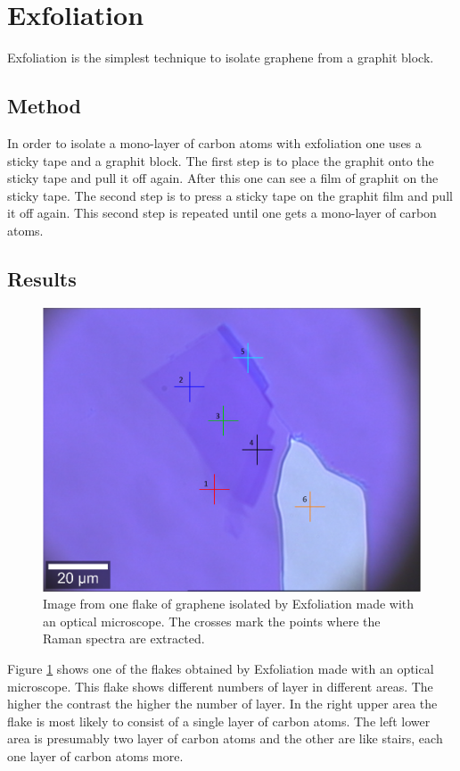 \documentclass[12pt,a4paper]{article}
\begin{document}
\section{Exfoliation}
Exfoliation is the simplest technique to isolate graphene from a graphit block.

\subsection{Method}
In order to isolate a mono-layer of carbon atoms with exfoliation one uses a sticky tape and a graphit block. The first step is to place the graphit onto the sticky tape and pull it off again. After this one can see a film of graphit on the sticky tape. The second step is to press a sticky tape on the graphit film and pull it off again. This second step is repeated until one gets a mono-layer of carbon atoms.

\subsection{Results}

\begin{figure}
\centering
\includegraphics[scale=0.35]{Bilder/Exfoliation/mono_bi_tri_flake.PNG}
\caption{Image from one flake of graphene isolated by Exfoliation made with an optical microscope. The crosses mark the points where the Raman spectra are extracted.}
\label{fig:Exfoliation_Microscope}
\end{figure}

Figure \ref{fig:Exfoliation_Microscope} shows one of the flakes obtained by Exfoliation made with an optical microscope. This flake shows different numbers of layer in different areas. The higher the contrast the higher the number of layer. In the right upper area the flake is most likely to consist of a single layer of carbon atoms. The left lower area is presumably two layer of carbon atoms and the other are like stairs, each one layer of carbon atoms more.
\end{document}
